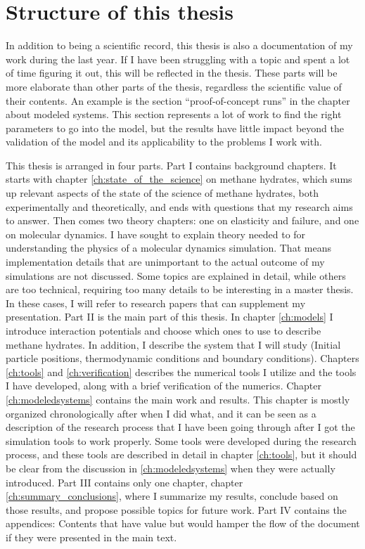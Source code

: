 \section{Structure of this thesis}
In addition to being a scientific record, this thesis is also a documentation of my work during the last year. If I have been struggling with a topic and spent a lot of time figuring it out, this will be reflected in the thesis. These parts will be more elaborate than other parts of the thesis, regardless the scientific value of their contents. An example is the section ``proof-of-concept runs'' in the chapter about modeled systems.  This section represents a lot of work to find the right parameters to go into the model, but the results have little impact beyond the validation of the model and its applicability to the problems I work with.

This thesis is arranged in four parts. Part I contains background chapters. It starts with chapter \ref{ch:state_of_the_science} on methane hydrates, which sums up relevant aspects of the state of the science of methane hydrates, both experimentally and theoretically, and ends with questions that my research aims to answer. Then comes two theory chapters: one on elasticity and failure, and one on molecular dynamics. I have sought to explain theory needed to for understanding the physics of a molecular dynamics simulation. That means implementation details that are unimportant to the actual outcome of my simulations are not discussed. Some topics are explained in detail, while others are too technical, requiring too many details to be interesting in a master thesis. In these cases, I will refer to research papers that can supplement my presentation. Part II is the main part of this thesis. In chapter \ref{ch:models} I introduce interaction potentials and choose which ones to use to describe methane hydrates. In addition, I describe the system that I will study (Initial particle positions, thermodynamic conditions and boundary conditions). Chapters \ref{ch:tools} and \ref{ch:verification} describes the numerical tools I utilize and the tools I have developed, along with a brief verification of the numerics. Chapter \ref{ch:modeledsystems} contains the main work and results. This chapter is mostly organized chronologically after when I did what, and it can be seen as a description of the research process that I have been going through after I got the simulation tools to work properly. Some tools were developed during the research process, and these tools are described in detail in chapter \ref{ch:tools}, but it should be clear from the discussion in \ref{ch:modeledsystems} when they were actually introduced. Part III contains only one chapter, chapter \ref{ch:summary_conclusions}, where I summarize my results, conclude based on those results, and propose possible topics for future work. Part IV contains the appendices: Contents that have value but would hamper the flow of the document if they were presented in the main text.


